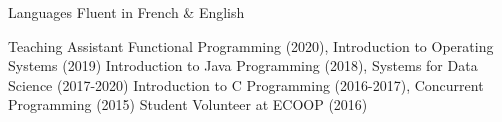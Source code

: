 


\begin{cvskills}


\cvskill
{Languages} %
{Fluent in French \& English} %

\cvskill
  {}
  {}

\cvskill
{Teaching Assistant} %
{
  Functional Programming (2020), Introduction to Operating Systems (2019)\linebreak
  Introduction to Java Programming (2018), Systems for Data Science (2017-2020)\linebreak
  Introduction to C Programming (2016-2017), Concurrent Programming (2015)\linebreak
	Student Volunteer at ECOOP (2016)
}


\end{cvskills}
